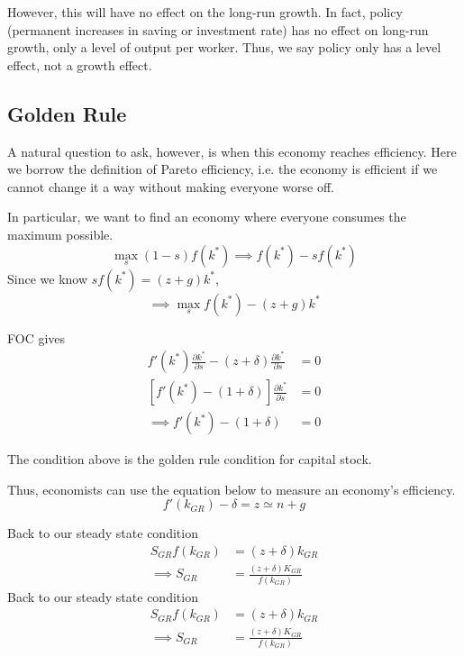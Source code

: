 \documentclass[twocolumn, fleqn]{article}
\begin{document}
			However, this will have no effect on the long-run growth.
			In fact, policy (permanent increases in saving or investment rate) has no effect on long-run growth,
			only a level of output per worker.
			Thus, we say policy only has a level effect, not a growth effect.

		\subsection{Golden Rule}
			A natural question to ask, however, is when this economy reaches efficiency.
			Here we borrow the definition of Pareto efficiency, i.e. the economy is efficient if we cannot change it
			a way without making everyone worse off.

			In particular, we want to find an economy where everyone consumes the maximum possible.
			\[\max_{s} (1-s)f(k^\ast) \implies f(k^\ast)-sf(k^\ast)\]
			Since we know $sf(k^\ast)=(z+g)k^\ast$,
			\[\implies \max_{s} f(k^\ast) - (z+g)k^\ast\]

			FOC gives
			\begin{align*}
				f'(k^\ast) \frac{\partial k^\ast}{\partial s}-(z+\delta) \frac{\partial k^\ast}{\partial s}&=0\\
				[f'(k^\ast)-(1+\delta)] \frac{\partial k^\ast}{\partial s}&=0\\
				\implies f'(k^\ast)-(1+\delta) &=0
			\end{align*}

			The condition above is the golden rule condition for capital stock.

			Thus, economists can use the equation below to measure an economy's efficiency.
			\[f'(k_{GR})-\delta = z \simeq n+g\]

			Back to our steady state condition
			\begin{align*}
				S_{GR} f(k_{GR}) &= (z+\delta)k_{GR}\\
				\implies S_{GR} &= \frac{(z +\delta)K_{GR}}{f(k_{GR})}
			\end{align*}
			Back to our steady state condition
			\begin{align*}
				S_{GR} f(k_{GR}) &= (z+\delta)k_{GR}\\
				\implies S_{GR} &= \frac{(z +\delta)K_{GR}}{f(k_{GR})}
			\end{align*}
\end{document}
